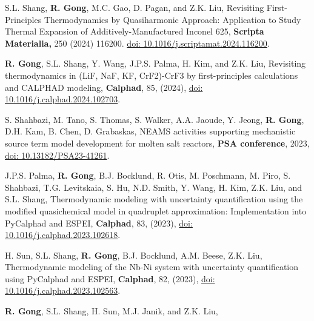 
\begin{etaremune}


\item S.L. Shang, \textbf{R. Gong}, M.C. Gao, D. Pagan, and Z.K. Liu,
Revisiting First-Principles Thermodynamics by Quasiharmonic Approach: Application to Study Thermal Expansion of Additively-Manufactured Inconel 625,
\textbf{Scripta Materialia,} 250 (2024) 116200.
\href{https://doi.org/10.1016/j.scriptamat.2024.116200}
{doi: 10.1016/j.scriptamat.2024.116200}.
\item \textbf{R. Gong}, S.L. Shang, Y. Wang, J.P.S. Palma, H. Kim, and Z.K. Liu, 
Revisiting thermodynamics in (LiF, NaF, KF, CrF2)-CrF3 by first-principles calculations and CALPHAD modeling,
\textbf{Calphad}, 85, (2024),
\href{https://doi.org/10.1016/j.calphad.2024.102703}
{doi: 10.1016/j.calphad.2024.102703}.
\item S. Shahbazi, M. Tano, S. Thomas, S. Walker, A.A. Jaoude, Y. Jeong, \textbf{R. Gong}, D.H. Kam, B. Chen, D. Grabaskas,
NEAMS activities supporting mechanistic source term model development for molten salt reactors,
\textbf{PSA conference}, 2023,
\href{https://doi.org/10.13182/PSA23-41261}
{doi: 10.13182/PSA23-41261}.
\item J.P.S. Palma, \textbf{R. Gong}, B.J. Bocklund, R. Otis, M. Poschmann, M. Piro, S. Shahbazi, T.G. Levitskaia, S. Hu,  N.D. Smith, Y. Wang, H. Kim, Z.K. Liu, and S.L. Shang, 
Thermodynamic modeling with uncertainty quantification using the modified quasichemical model in quadruplet approximation: Implementation into PyCalphad and ESPEI,  
\textbf{Calphad}, 83, (2023),
\href{https://doi.org/10.1016/j.calphad.2023.102618}
{doi: 10.1016/j.calphad.2023.102618}.
\item H. Sun, S.L. Shang, \textbf{R. Gong}, B.J. Bocklund, A.M. Beese, Z.K. Liu, 
Thermodynamic modeling of the Nb-Ni system with uncertainty quantification using PyCalphad and ESPEI, 
\textbf{Calphad}, 82, (2023),
\href{https://doi.org/10.1016/j.calphad.2023.102563}{doi: 10.1016/j.calphad.2023.102563}.
\item \textbf{R. Gong}, S.L. Shang, H. Sun, M.J. Janik, and Z.K. Liu,

\end{etaremune}
